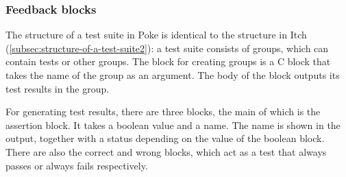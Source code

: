 \documentclass[../main]{subfiles}
\begin{document}
\subsubsection{Feedback blocks}

\begin{scratch}[scale=0.6]
\end{scratch}

The structure of a test suite in Poke is identical to the structure in Itch (\cref{subsec:structure-of-a-test-suite2}): a test suite consists of groups, which can contain tests or other groups.
The block for creating groups is a C block that takes the name of the group as an argument.
The body of the block outputs its test results in the group.

\begin{varwidth}{0.40\linewidth}
    \begin{scratch}[scale=0.6]
    \end{scratch}
\end{varwidth}%
\hspace{1em}%
\begin{varwidth}{0.28\linewidth}
    \begin{scratch}[scale=0.6]
    \end{scratch}
\end{varwidth}%
\hspace{1em}%
\begin{varwidth}{0.25\linewidth}
    \begin{scratch}[scale=0.6]
    \end{scratch}
\end{varwidth}

For generating test results, there are three blocks, the main of which is the assertion block.
It takes a boolean value and a name.
The name is shown in the output, together with a status depending on the value of the boolean block.
There are also the correct and wrong blocks, which act as a test that always passes or always fails respectively.

\begin{scratch}[scale=0.6,else word={}]
\end{scratch}
\end{document}
